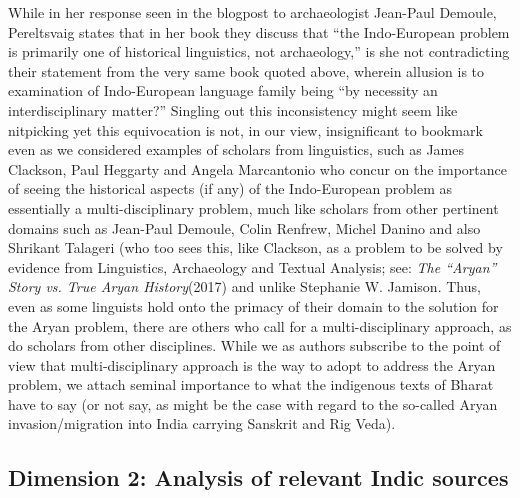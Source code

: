 While in her response seen in the blogpost to archaeologist Jean-Paul Demoule, Pereltsvaig states that in her book they discuss that “the Indo-European problem is primarily one of historical linguistics, not archaeology,” is she not contradicting their statement from the very same book quoted above, wherein allusion is to examination of Indo-European language family being “by necessity an interdisciplinary matter?” Singling out this inconsistency might seem like nitpicking yet this equivocation is not, in our view, insignificant to bookmark even as we considered examples of scholars from linguistics, such as James Clackson, Paul Heggarty and Angela Marcantonio who concur on the importance of seeing the historical aspects (if any) of the Indo-European problem as essentially a multi-disciplinary problem, much like scholars from other pertinent domains such as Jean-Paul Demoule, Colin Renfrew, Michel Danino and also Shrikant Talageri (who too sees this, like Clackson, as a problem to be solved by evidence from Linguistics, Archaeology and Textual Analysis; see: \textit{The “Aryan” Story vs. True Aryan History}(2017) and unlike Stephanie W. Jamison. Thus, even as some linguists hold onto the primacy of their domain to the solution for the Aryan problem, there are others who call for a multi-disciplinary approach, as do scholars from other disciplines. While we as authors subscribe to the point of view that multi-disciplinary approach is the way to adopt to address the Aryan problem, we attach seminal importance to what the indigenous texts of Bharat have to say (or not say, as might be the case with regard to the so-called Aryan invasion/migration into India carrying Sanskrit and Rig Veda).


\subsection{Dimension 2: Analysis of relevant Indic sources}

